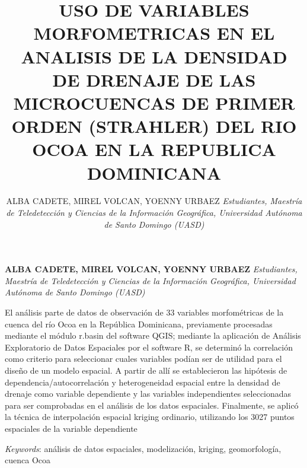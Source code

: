 \documentclass[11pt,]{article}
\title{USO DE VARIABLES MORFOMETRICAS EN EL ANALISIS DE LA DENSIDAD DE DRENAJE
DE LAS MICROCUENCAS DE PRIMER ORDEN (STRAHLER) DEL RIO OCOA EN LA
REPUBLICA DOMINICANA  }
\author{\Large ALBA CADETE, MIREL VOLCAN, YOENNY URBAEZ\vspace{0.05in} \newline\normalsize\emph{Estudiantes, Maestría de Teledetección y Ciencias de la Información
Geográfica, Universidad Autónoma de Santo Domingo (UASD)}  }
\date{}
\newcommand*{\authorfont}{\fontfamily{phv}\selectfont}
\renewenvironment{abstract}
 {{%
    \setlength{\leftmargin}{0mm}
    \setlength{\rightmargin}{\leftmargin}%
  }%
  \relax}
 {\endlist}
\begin{document}
	
%

{%
\setlength{\parindent}{0pt}
\thispagestyle{plain}
{\fontsize{18}{20}\selectfont\raggedright 
\maketitle  %

}

{
   \vskip 13.5pt\relax \normalsize\fontsize{11}{12} 
\textbf{\authorfont ALBA CADETE, MIREL VOLCAN, YOENNY URBAEZ} \hskip 15pt \emph{\small Estudiantes, Maestría de Teledetección y Ciencias de la Información
Geográfica, Universidad Autónoma de Santo Domingo (UASD)}   

}

}








\begin{abstract}

    \hbox{\vrule height .2pt width 39.14pc}

    \vskip 8.5pt %

\noindent El análisis parte de datos de observación de 33 variables morfométricas
de la cuenca del río Ocoa en la República Dominicana, previamente
procesadas mediante el módulo r.basin del software QGIS; mediante la
aplicación de Análisis Exploratorio de Datos Espaciales por el software
R, se determinó la correlación como criterio para seleccionar cuales
variables podían ser de utilidad para el diseño de un modelo espacial. A
partir de allí se establecieron las hipótesis de
dependencia/autocorrelación y heterogeneidad espacial entre la densidad
de drenaje como variable dependiente y las variables independientes
seleccionadas para ser comprobadas en el análisis de los datos
espaciales. Finalmente, se aplicó la técnica de interpolación espacial
kriging ordinario, utilizando los 3027 puntos espaciales de la variable
dependiente


\vskip 8.5pt \noindent \emph{Keywords}: análisis de datos espaciales, modelización, kriging, geomorfología,
cuenca Ocoa \par

    \hbox{\vrule height .2pt width 39.14pc}



\end{abstract}
\end{document}
